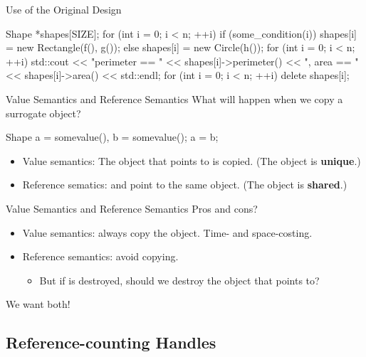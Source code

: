 \documentclass{beamer}
\begin{document}
\begin{frame}[fragile]{Use of the Original Design}
    \begin{cpp}
Shape *shapes[SIZE];
for (int i = 0; i < n; ++i) {
  if (some_condition(i))
    shapes[i] = new Rectangle(f(), g());
  else
    shapes[i] = new Circle(h());
}
for (int i = 0; i < n; ++i) {
  std::cout << "perimeter == " << shapes[i]->perimeter()
            << ", area == " << shapes[i]->area()
            << std::endl;
}
for (int i = 0; i < n; ++i)
  delete shapes[i];
    \end{cpp}
\end{frame}

\begin{frame}[fragile]{Value Semantics and Reference Semantics}
    What will happen when we copy a surrogate object?
    \begin{cpp}
Shape a = somevalue(), b = somevalue();
a = b;
    \end{cpp}
    \begin{itemize}
        \item Value semantics: The object that  points to is copied. (The object is \textbf{unique}.)
        \item Reference sematics:  and  point to the same object. (The object is \textbf{shared}.)
    \end{itemize}
\end{frame}

\begin{frame}{Value Semantics and Reference Semantics}
    Pros and cons?
    \begin{itemize}
        \item Value semantics: always copy the object. Time- and space-costing.
        \item Reference semantics: avoid copying.
        \begin{itemize}
            \item But if  is destroyed, should we destroy the object that  points to?
        \end{itemize}
    \end{itemize}
    \pause
    We want both!
\end{frame}

\subsection{Reference-counting Handles}
\end{document}
